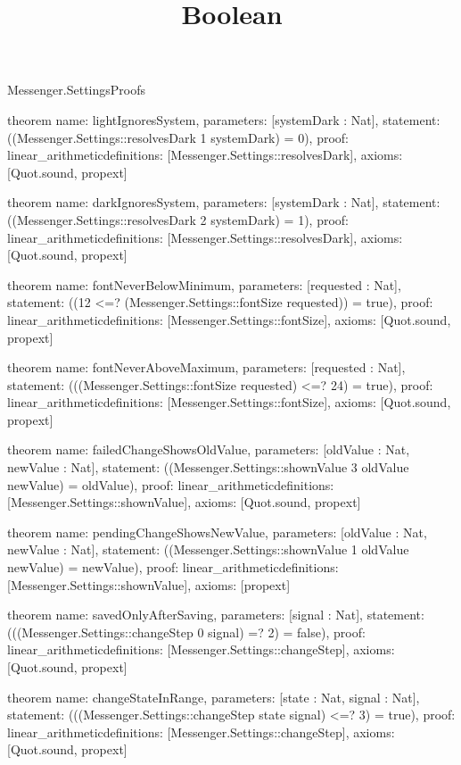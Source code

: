 \begin{lexlean}{Messenger.SettingsProofs}
\title{Boolean}
\begin{semanticmodule}
theorem{
  name: lightIgnoresSystem,
  parameters: [systemDark : Nat],
  statement: ((Messenger.Settings::resolvesDark 1 systemDark) = 0),
  proof: linear_arithmetic{definitions: [Messenger.Settings::resolvesDark]},
  axioms: [Quot.sound, propext]
}

theorem{
  name: darkIgnoresSystem,
  parameters: [systemDark : Nat],
  statement: ((Messenger.Settings::resolvesDark 2 systemDark) = 1),
  proof: linear_arithmetic{definitions: [Messenger.Settings::resolvesDark]},
  axioms: [Quot.sound, propext]
}

theorem{
  name: fontNeverBelowMinimum,
  parameters: [requested : Nat],
  statement: ((12 <=? (Messenger.Settings::fontSize requested)) = true),
  proof: linear_arithmetic{definitions: [Messenger.Settings::fontSize]},
  axioms: [Quot.sound, propext]
}

theorem{
  name: fontNeverAboveMaximum,
  parameters: [requested : Nat],
  statement: (((Messenger.Settings::fontSize requested) <=? 24) = true),
  proof: linear_arithmetic{definitions: [Messenger.Settings::fontSize]},
  axioms: [Quot.sound, propext]
}

theorem{
  name: failedChangeShowsOldValue,
  parameters: [oldValue : Nat, newValue : Nat],
  statement: ((Messenger.Settings::shownValue 3 oldValue newValue) = oldValue),
  proof: linear_arithmetic{definitions: [Messenger.Settings::shownValue]},
  axioms: [Quot.sound, propext]
}

theorem{
  name: pendingChangeShowsNewValue,
  parameters: [oldValue : Nat, newValue : Nat],
  statement: ((Messenger.Settings::shownValue 1 oldValue newValue) = newValue),
  proof: linear_arithmetic{definitions: [Messenger.Settings::shownValue]},
  axioms: [propext]
}

theorem{
  name: savedOnlyAfterSaving,
  parameters: [signal : Nat],
  statement: (((Messenger.Settings::changeStep 0 signal) =? 2) = false),
  proof: linear_arithmetic{definitions: [Messenger.Settings::changeStep]},
  axioms: [Quot.sound, propext]
}

theorem{
  name: changeStateInRange,
  parameters: [state : Nat, signal : Nat],
  statement: (((Messenger.Settings::changeStep state signal) <=? 3) = true),
  proof: linear_arithmetic{definitions: [Messenger.Settings::changeStep]},
  axioms: [Quot.sound, propext]
}


\end{semanticmodule}
\end{lexlean}

